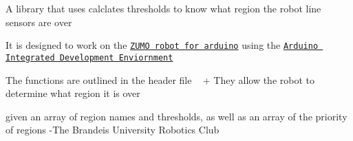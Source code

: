 
\begin{DoxyItemize}
\item A library that uses calclates thresholds to know what region the robot line sensors are over
\begin{DoxyItemize}
\item It is designed to work on the \href{https://www.pololu.com/product/2506}{\tt Z\+U\+MO robot for arduino} using the \href{https://www.arduino.cc/en/Main/Software}{\tt Arduino Integrated Development Enviornment}
\end{DoxyItemize}
\item The functions are outlined in the header file ~\newline
 + They allow the robot to determine what region it is over
\begin{DoxyItemize}
\item given an array of region names and thresholds, as well as an array of the priority of regions -\/\+The Brandeis University Robotics Club  
\end{DoxyItemize}
\end{DoxyItemize}